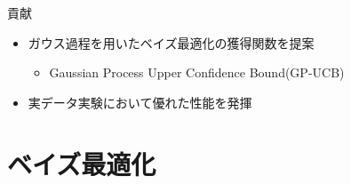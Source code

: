 \documentclass[dvipdfmx, 10.5pt]{beamer}
\begin{document}
\begin{frame}{\insertsubsection}
	\vspace{20pt}
	\begin{block}{貢献}
		\begin{itemize}
			\vspace{5pt}
			\item ガウス過程を用いたベイズ最適化の獲得関数を提案
			\begin{itemize}
				\vspace{3pt}
				\item Gaussian Process Upper Confidence Bound(GP-UCB)
			\end{itemize}
			\vspace{6pt}
			\item 実データ実験において優れた性能を発揮
			\vspace{5pt}
		\end{itemize}
	\end{block}



\end{frame}

\section{ベイズ最適化}
\end{document}
